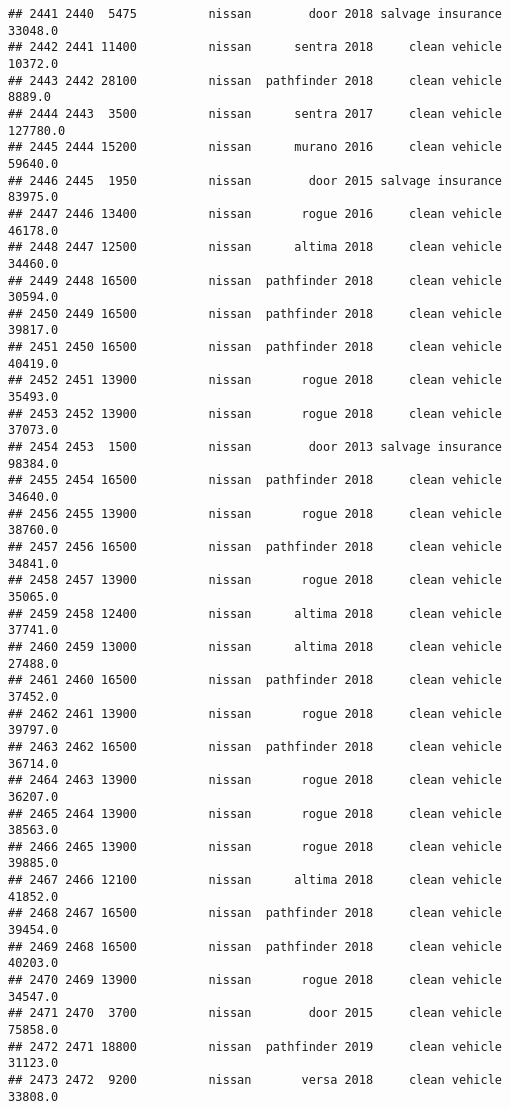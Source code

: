 \documentclass[
]{article}
\begin{document}
\begin{verbatim}
## 2441 2440  5475          nissan        door 2018 salvage insurance   33048.0
## 2442 2441 11400          nissan      sentra 2018     clean vehicle   10372.0
## 2443 2442 28100          nissan  pathfinder 2018     clean vehicle    8889.0
## 2444 2443  3500          nissan      sentra 2017     clean vehicle  127780.0
## 2445 2444 15200          nissan      murano 2016     clean vehicle   59640.0
## 2446 2445  1950          nissan        door 2015 salvage insurance   83975.0
## 2447 2446 13400          nissan       rogue 2016     clean vehicle   46178.0
## 2448 2447 12500          nissan      altima 2018     clean vehicle   34460.0
## 2449 2448 16500          nissan  pathfinder 2018     clean vehicle   30594.0
## 2450 2449 16500          nissan  pathfinder 2018     clean vehicle   39817.0
## 2451 2450 16500          nissan  pathfinder 2018     clean vehicle   40419.0
## 2452 2451 13900          nissan       rogue 2018     clean vehicle   35493.0
## 2453 2452 13900          nissan       rogue 2018     clean vehicle   37073.0
## 2454 2453  1500          nissan        door 2013 salvage insurance   98384.0
## 2455 2454 16500          nissan  pathfinder 2018     clean vehicle   34640.0
## 2456 2455 13900          nissan       rogue 2018     clean vehicle   38760.0
## 2457 2456 16500          nissan  pathfinder 2018     clean vehicle   34841.0
## 2458 2457 13900          nissan       rogue 2018     clean vehicle   35065.0
## 2459 2458 12400          nissan      altima 2018     clean vehicle   37741.0
## 2460 2459 13000          nissan      altima 2018     clean vehicle   27488.0
## 2461 2460 16500          nissan  pathfinder 2018     clean vehicle   37452.0
## 2462 2461 13900          nissan       rogue 2018     clean vehicle   39797.0
## 2463 2462 16500          nissan  pathfinder 2018     clean vehicle   36714.0
## 2464 2463 13900          nissan       rogue 2018     clean vehicle   36207.0
## 2465 2464 13900          nissan       rogue 2018     clean vehicle   38563.0
## 2466 2465 13900          nissan       rogue 2018     clean vehicle   39885.0
## 2467 2466 12100          nissan      altima 2018     clean vehicle   41852.0
## 2468 2467 16500          nissan  pathfinder 2018     clean vehicle   39454.0
## 2469 2468 16500          nissan  pathfinder 2018     clean vehicle   40203.0
## 2470 2469 13900          nissan       rogue 2018     clean vehicle   34547.0
## 2471 2470  3700          nissan        door 2015     clean vehicle   75858.0
## 2472 2471 18800          nissan  pathfinder 2019     clean vehicle   31123.0
## 2473 2472  9200          nissan       versa 2018     clean vehicle   33808.0

\end{verbatim}
\end{document}
